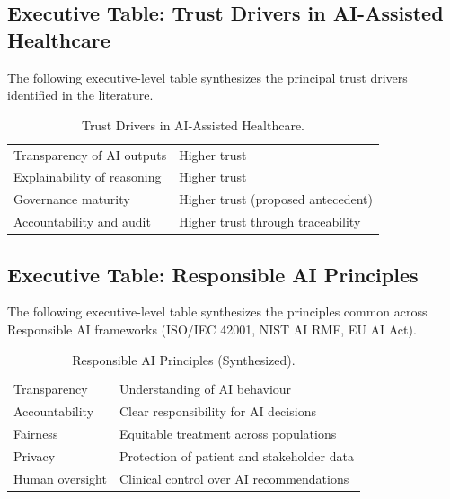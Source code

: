 \subsection{Executive Table: Trust Drivers in AI-Assisted Healthcare}
\label{sec:exec_trust_drivers}

\noindent The following executive-level table synthesizes the principal trust drivers identified in the literature.

{\tablestripes\tablefontsize
{}
\begin{xltabular}{\textwidth}{@{} >{\raggedright\arraybackslash}p{6cm} L @{}}
\caption[Trust Drivers in AI-Assisted Healthcare]{Trust Drivers in AI-Assisted Healthcare.}\label{tab:exec_trust_drivers} \\
\toprule
{} &  \\
\midrule
\endfirsthead
\endhead
\bottomrule
\endlastfoot
Transparency of AI outputs & Higher trust \\
\addlinespace
Explainability of reasoning & Higher trust \\
\addlinespace
Governance maturity & Higher trust (proposed antecedent) \\
\addlinespace
Accountability and audit & Higher trust through traceability \\
\end{xltabular}}


\subsection{Executive Table: Responsible AI Principles}
\label{sec:exec_responsible_ai}

\noindent The following executive-level table synthesizes the principles common across Responsible AI frameworks (ISO/IEC 42001, NIST AI RMF, EU AI Act).

{\tablestripes\tablefontsize
{}
\begin{xltabular}{\textwidth}{@{} >{\raggedright\arraybackslash}p{6cm} L @{}}
\caption[Responsible AI Principles (Synthesized)]{Responsible AI Principles (Synthesized).}\label{tab:exec_responsible_ai} \\
\toprule
{} &  \\
\midrule
\endfirsthead
\endhead
\bottomrule
\endlastfoot
Transparency & Understanding of AI behaviour \\
\addlinespace
Accountability & Clear responsibility for AI decisions \\
\addlinespace
Fairness & Equitable treatment across populations \\
\addlinespace
Privacy & Protection of patient and stakeholder data \\
\addlinespace
Human oversight & Clinical control over AI recommendations \\
\end{xltabular}}


